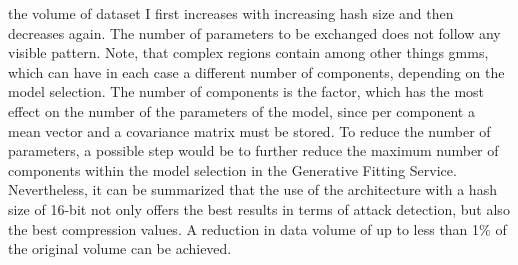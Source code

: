 \documentclass[../../main.tex]{subfiles}
\begin{document}
the volume of dataset I first increases with increasing hash size and then decreases again. The number of parameters to be exchanged does not follow any visible pattern. Note, that complex regions contain among other things \glspl{gmm}, which can have in each case a different number of components, depending on the model selection. The number of components is the factor, which has the most effect on the number of the parameters of the model, since per component a mean vector and a covariance matrix must be stored. To reduce the number of parameters, a possible step would be to further reduce the maximum number of components within the model selection in the Generative Fitting Service. Nevertheless, it can be summarized that the use of the architecture with a hash size of 16-bit not only offers the best results in terms of attack detection, but also the best compression values. A reduction in data volume of up to less than 1\% of the original volume can be achieved. 
\end{document}
